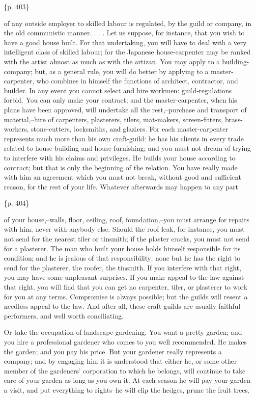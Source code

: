 \{p. 403\}

of any outside employer to skilled labour is regulated, by the guild or company, in the old communistic manner. . . . Let us suppose, for instance, that you wish to have a good house built. For that undertaking, you will have to deal with a very intelligent class of skilled labour; for the Japanese house-carpenter may be ranked with the artist almost as much as with the artizan. You may apply to a building-company; but, as a general rule, you will do better by applying to a master-carpenter, who combines in himself the functions of architect, contractor, and builder. In any event you cannot select and hire workmen: guild-regulations forbid. You can only make your contract; and the master-carpenter, when his plans have been approved, will undertake all the rest,--purchase and transport of material,--hire of carpenters, plasterers, tilers, mat-makers, screen-fitters, brass-workers, stone-cutters, locksmiths, and glaziers. For each master-carpenter represents much more than his own craft-guild: he has his clients in every trade related to house-building and house-furnishing; and you must not dream of trying to interfere with his claims and privileges. He builds your house according to contract; but that is only the beginning of the relation. You have really made with him an agreement which you must not break, without good and sufficient reason, for the rest of your life. Whatever afterwards may happen to any part

\{p. 404\}

of your house,--walls, floor, ceiling, roof, foundation,--you must arrange for repairs with him, never with anybody else. Should the roof leak, for instance, you must not send for the nearest tiler or tinsmith; if the plaster cracks, you must not send for a plasterer. The man who built your house holds himself responsible for its condition; and he is jealous of that responsibility: none but he has the right to send for the plasterer, the roofer, the tinsmith. If you interfere with that right, you may have some unpleasant surprises. If you make appeal to the law against that right, you will find that you can get no carpenter, tiler, or plasterer to work for you at any terms. Compromise is always possible; but the guilds will resent a needless appeal to the law. And after all, these craft-guilds are usually faithful performers, and well worth conciliating.



Or take the occupation of landscape-gardening. You want a pretty garden; and you hire a professional gardener who comes to you well recommended. He makes the garden; and you pay his price. But your gardener really represents a company; and by engaging him it is understood that either he, or some other member of the gardeners' corporation to which he belongs, will continue to take care of your garden as long as you own it. At each season he will pay your garden a visit, and put everything to rights--he will clip the hedges, prune the fruit trees,

